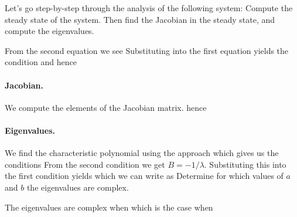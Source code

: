 
\label{exComplexComplex}
Let's go step-by-step through the analysis of the following system:
\subquestion
Compute the steady state of the system. Then find the Jacobian in the steady state, and compute the eigenvalues.

\solution
From the second equation we see 
Substituting into the first equation yields the condition
and hence 
\paragraph{Jacobian.}We compute the elements of the Jacobian matrix.
hence
\paragraph{Eigenvalues.}We find the characteristic polynomial using the approach 
which gives us the conditions 
From the second condition we get $B=-1/\lambda$. Substituting this into the first condition yields 
which we can write as 
\subquestion 
Determine for which values of $a$ and $b$ the eigenvalues are complex.

\solution
The eigenvalues are complex when
which is the case when 

